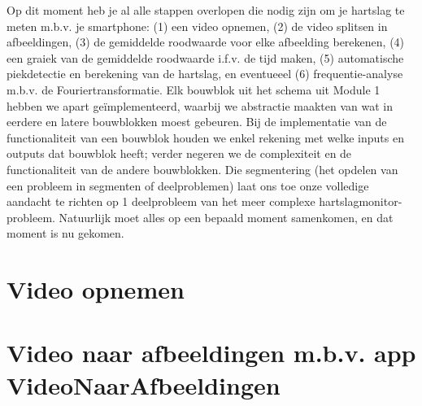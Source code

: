 
\begin{samenvatting}
	Op dit moment heb je al alle stappen overlopen die nodig zijn om je hartslag te meten m.b.v. je smartphone: (1) een video opnemen, (2) de video splitsen in afbeeldingen, (3) de gemiddelde roodwaarde voor elke afbeelding berekenen, (4) een graiek van de gemiddelde roodwaarde i.f.v. de tijd maken, (5) automatische piekdetectie en berekening van de hartslag, en eventueeel (6) frequentie-analyse m.b.v. de Fouriertransformatie. 
	Elk bouwblok uit het schema uit Module 1 hebben we apart ge\"implementeerd, waarbij we abstractie maakten van wat in eerdere en latere bouwblokken moest gebeuren.
	Bij de implementatie van de functionaliteit van een bouwblok houden we enkel rekening met welke inputs en outputs dat bouwblok heeft; verder negeren we de complexiteit en de functionaliteit van de andere bouwblokken.
	Die segmentering (het opdelen van een probleem in segmenten of deelproblemen) laat ons toe onze volledige aandacht te richten op 1 deelprobleem van het meer complexe hartslagmonitor-probleem.
	Natuurlijk moet alles op een bepaald moment samenkomen, en dat moment is nu gekomen.
\end{samenvatting}
%

\section{Video opnemen}
\label{sec:Mod5_Sec1}
%

\section{Video naar afbeeldingen m.b.v. app VideoNaarAfbeeldingen}
\label{sec:Mod5_Sec2}
%

